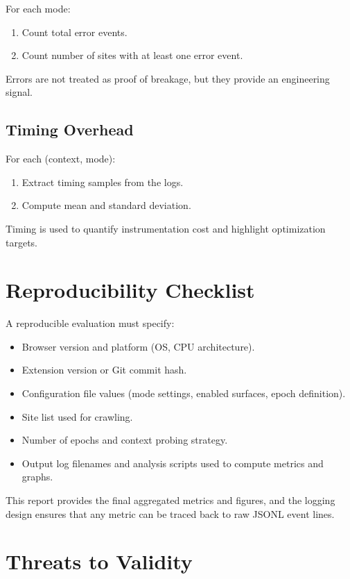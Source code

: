 \documentclass[11pt]{report}
\begin{document}
For each mode:
\begin{enumerate}
    \item Count total error events.
    \item Count number of sites with at least one error event.
\end{enumerate}

Errors are not treated as proof of breakage, but they provide an engineering signal.

\subsection{Timing Overhead}

For each (context, mode):
\begin{enumerate}
    \item Extract timing samples from the logs.
    \item Compute mean and standard deviation.
\end{enumerate}

Timing is used to quantify instrumentation cost and highlight optimization targets.

\section{Reproducibility Checklist}

A reproducible evaluation must specify:

\begin{itemize}
    \item Browser version and platform (OS, CPU architecture).
    \item Extension version or Git commit hash.
    \item Configuration file values (mode settings, enabled surfaces, epoch definition).
    \item Site list used for crawling.
    \item Number of epochs and context probing strategy.
    \item Output log filenames and analysis scripts used to compute metrics and graphs.
\end{itemize}

This report provides the final aggregated metrics and figures, and the logging design ensures that any metric can be traced back to raw JSONL event lines.

\section{Threats to Validity}
\end{document}
